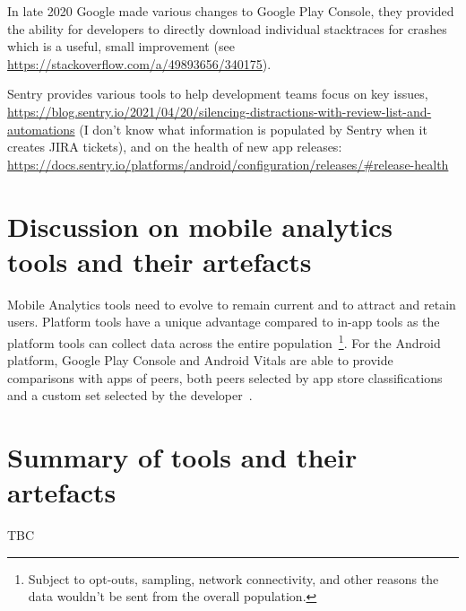In late 2020 Google made various changes to Google Play Console, they provided the ability for developers to directly download individual stacktraces for crashes~\citep{stackoverflow2018_how_can_i_get_app_crash_log_from_google_play_console} which is a useful, small improvement (see \url{https://stackoverflow.com/a/49893656/340175}).


Sentry provides various tools to help development teams focus on key issues,  \url{https://blog.sentry.io/2021/04/20/silencing-distractions-with-review-list-and-automations} (I don't know what information is populated by Sentry when it creates JIRA tickets),  and on the health of new app releases: \url{https://docs.sentry.io/platforms/android/configuration/releases/#release-health}


\section{Discussion on mobile analytics tools and their artefacts}
Mobile Analytics tools need to evolve to remain current and to attract and retain users. Platform tools have a unique advantage compared to in-app tools as the platform tools can collect data across the entire population~\footnote{Subject to opt-outs, sampling, network connectivity, and other reasons the data wouldn't be sent from the overall population.}. For the Android platform, Google Play Console and Android Vitals are able to provide comparisons with apps of peers, both peers selected by app store classifications~\citep{androiddevelopersblog2021_gpc_powers_better_strategic_decisions_etc} and a custom set selected by the developer~\citep{play_console_help_compare_your_apps_android_vitals_and_ratings_with_peer_groups}. 

\section{Summary of tools and their artefacts}
TBC